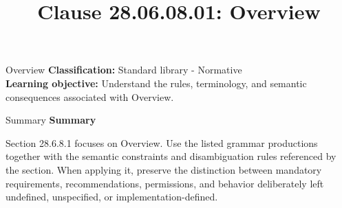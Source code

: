 \documentclass[10pt,letterpaper]{article}
\title{Clause 28.06.08.01: Overview}
\author{}
\date{}
\begin{document}
\maketitle
\begin{CornellOverviewBox}{Overview}
\textbf{Classification:} Standard library - Normative\\[2pt]
\textbf{Learning objective:} Understand the rules, terminology, and semantic consequences associated with Overview.
\end{CornellOverviewBox}\begin{CornellSummaryBox}{Summary}
{\sffamily\bfseries\color{Accent} Summary}\par\vspace{3pt}Section 28.6.8.1 focuses on Overview. Use the listed grammar productions together with the semantic constraints and disambiguation rules referenced by the section. When applying it, preserve the distinction between mandatory requirements, recommendations, permissions, and behavior deliberately left undefined, unspecified, or implementation-defined.
\end{CornellSummaryBox}
\end{document}
